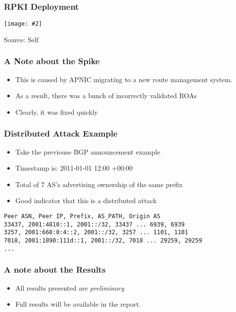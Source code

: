 \documentclass{beamer}
\newcommand{\framedgraphic}[3]{
    \begin{frame}
        \frametitle{#1}
        \begin{center}
            \texttt{[image: \#2]}
        \end{center}
        {\small Source: #3}
    \end{frame}
}
\begin{document}
\framedgraphic{RPKI Deployment}{pictures/rpki-deployment-self.png}{Self}

\begin{frame}
    \frametitle{A Note about the Spike}

    \begin{itemize}
        \item This is caused by APNIC migrating to a new route management system. \pause
        \item As a result, there was a bunch of incorrectly validated ROAs \pause
        \item Clearly, it was fixed quickly
    \end{itemize}

\end{frame}

\begin{frame}[fragile]
    \frametitle{Distributed Attack Example}

    \begin{itemize}
        \item Take the previouse BGP announcement example
        \item Timestamp is: 2011-01-01 12:00 +00:00
        \item Total of 7 AS's advertising ownership of the same prefix
        \item Good indicator that this is a distributed attack
    \end{itemize}

    \begin{Verbatim}[fontsize=\small]
Peer ASN, Peer IP, Prefix, AS_PATH, Origin AS
33437, 2001:4810::1, 2001::/32, 33437 ... 6939, 6939
3257, 2001:668:0:4::2, 2001::/32, 3257 ... 1101, 1101
7018, 2001:1890:111d::1, 2001::/32, 7018 ... 29259, 29259
...
    \end{Verbatim}

\end{frame}


\begin{frame}
    \frametitle{A note about the Results}

    \begin{itemize}
        \item All results presented are \emph{preliminary}
        \item Full results will be available in the report.
    \end{itemize}

\end{frame}
\end{document}
